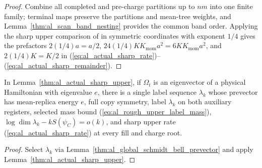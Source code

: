 \begin{proof}
    \leanok
    Combine all completed and pre-charge partitions up to $nm$ into one finite
    family; terminal maps preserve the partitions and mean-tree weights, and
    Lemma~\ref{thm:al_scan_band_nesting} provides the common band order.
    Applying the sharp upper comparison of
    \cite[Section~8, lines~383--418]{OpenAI2026AreaLaw} in symmetric
    coordinates with exponent $1/4$ gives the prefactors $2(1/4)a=a/2$,
    $24(1/4)K K_{\mathrm{mom}}a^2=6K K_{\mathrm{mom}}a^2$, and $2(1/4)K=K/2$ in
    (\ref{eq:al_actual_sharp_rate})--(\ref{eq:al_actual_sharp_remainder}).
\end{proof}

\begin{lemma}
    \label{thm:al_actual_sharp_prevector}
    \leanok
    In Lemma~\ref{thm:al_actual_sharp_upper}, if $\Omega_t$ is an eigenvector
    of a physical Hamiltonian with eigenvalue $e$, there is a single label
    sequence $\lambda_k$ whose prevector has mean-replica energy $e$, full copy
    symmetry, label $\lambda_k$ on both auxiliary registers, selected mass bound
    (\ref{eq:al_rough_upper_label_mass}), $\log\dim\lambda_k-kS(\psi_C)=o(k)$,
    and sharp upper rate (\ref{eq:al_actual_sharp_rate}) at every fill and
    charge root.
\end{lemma}
\begin{proof}
    \leanok
    Select $\lambda_k$ via Lemma~\ref{thm:al_global_schmidt_bell_prevector}
    and apply Lemma~\ref{thm:al_actual_sharp_upper}.
\end{proof}

